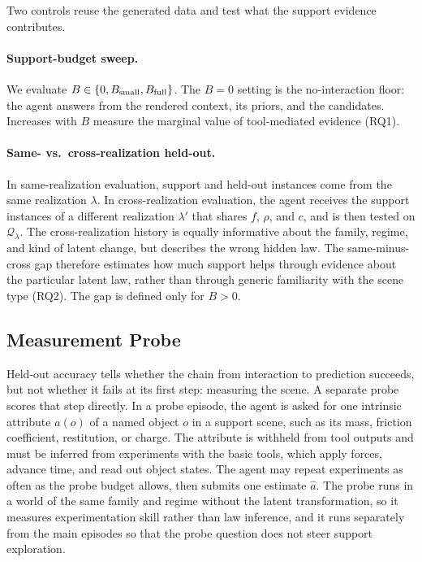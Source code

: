 Two controls reuse the generated data and test what the support evidence contributes.

\paragraph{Support-budget sweep.} We evaluate $B \in \{0,B_{\rm small},B_{\rm full}\}$. The $B=0$ setting is the no-interaction floor: the agent answers from the rendered context, its priors, and the candidates. Increases with $B$ measure the marginal value of tool-mediated evidence (RQ1).

\paragraph{Same- vs.\ cross-realization held-out.} In same-realization evaluation, support and held-out instances come from the same realization $\lambda$. In cross-realization evaluation, the agent receives the support instances of a different realization $\lambda'$ that shares $f$, $\rho$, and $c$, and is then tested on $\mathcal{Q}_\lambda$. The cross-realization history is equally informative about the family, regime, and kind of latent change, but describes the wrong hidden law. The same-minus-cross gap therefore estimates how much support helps through evidence about the particular latent law, rather than through generic familiarity with the scene type (RQ2). The gap is defined only for $B>0$.

\subsection{Measurement Probe}
\label{sec:protocol:probe}

Held-out accuracy tells whether the chain from interaction to prediction succeeds, but not whether it fails at its first step: measuring the scene. A separate probe scores that step directly. In a probe episode, the agent is asked for one intrinsic attribute $a(o)$ of a named object $o$ in a support scene, such as its mass, friction coefficient, restitution, or charge. The attribute is withheld from tool outputs and must be inferred from experiments with the basic tools, which apply forces, advance time, and read out object states. The agent may repeat experiments as often as the probe budget allows, then submits one estimate $\hat a$. The probe runs in a world of the same family and regime without the latent transformation, so it measures experimentation skill rather than law inference, and it runs separately from the main episodes so that the probe question does not steer support exploration.

